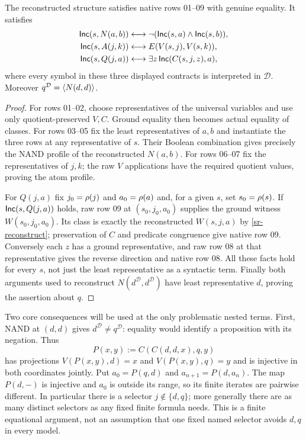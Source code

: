 \begin{srlemma}\label{sr-core}
The reconstructed structure satisfies native rows 01--09 with genuine
equality. It satisfies
\begin{align*}
\mathsf{Inc}(s,N(a,b))&\longleftrightarrow
                  \neg(\mathsf{Inc}(s,a)\land\mathsf{Inc}(s,b)),\\
\mathsf{Inc}(s,A(j,k))&\longleftrightarrow E(V(s,j),V(s,k)),\\
\mathsf{Inc}(s,Q(j,a))&\longleftrightarrow
                  \exists z\,\mathsf{Inc}(C(s,j,z),a),
\end{align*}
where every symbol in these three displayed contracts is interpreted in
$\mathcal D$. Moreover $q^{\mathcal D}=\langle N(d,d)\rangle$.
\end{srlemma}
\begin{proof}
For rows 01--02, choose representatives of the universal variables and use
only quotient-preserved $V,C$. Ground equality then becomes actual equality
of classes. For rows 03--05 fix the least representatives of $a,b$ and
instantiate the three rows at any representative of $s$. Their Boolean
combination gives precisely the NAND profile of the reconstructed
$N(a,b)$. For rows 06--07 fix the representatives of $j,k$; the raw $V$
applications have the required quotient values, proving the atom profile.

For $Q(j,a)$ fix $j_0=\rho(j)$ and $a_0=\rho(a)$ and, for a given
$s$, set $s_0=\rho(s)$. If $\mathsf{Inc}(s,Q(j,a))$ holds, raw row 09 at
$(s_0,j_0,a_0)$ supplies the ground witness $W(s_0,j_0,a_0)$. Its class is
exactly the reconstructed $W(s,j,a)$ by \eqref{sr-reconstruct}; preservation
of $C$ and predicate congruence give native row 09. Conversely each $z$ has
a ground representative, and raw row 08 at that representative gives the
reverse direction and native row 08. All these facts hold for every $s$,
not just the least representative as a syntactic term. Finally both
arguments used to reconstruct $N(d^{\mathcal D},d^{\mathcal D})$ have least
representative $d$, proving the assertion about $q$.
\end{proof}

Two core consequences will be used at the only problematic nested terms.
First, NAND at $(d,d)$ gives $d^{\mathcal D}\ne q^{\mathcal D}$: equality
would identify a proposition with its negation. Thus
\[
P(x,y):=C(C(d,d,x),q,y)
\]
has projections $V(P(x,y),d)=x$ and $V(P(x,y),q)=y$ and is injective in
both coordinates jointly. Put $a_0=P(q,d)$ and $a_{n+1}=P(d,a_n)$.
The map $P(d,-)$ is injective and $a_0$ is outside its range, so its finite
iterates are pairwise different. In particular there is a selector
$j\notin\{d,q\}$; more generally there are as many distinct selectors as
any fixed finite formula needs. This is a finite equational argument, not
an assumption that one fixed named selector avoids $d,q$ in every model.

